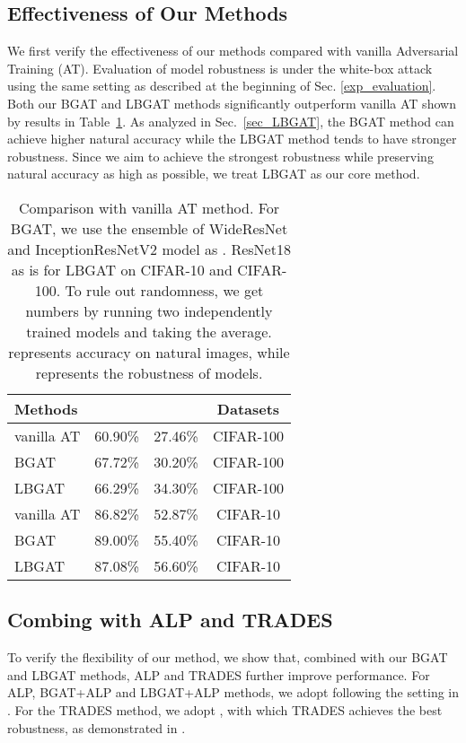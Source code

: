 \documentclass[final]{cvpr}
\begin{document}
\subsection{Effectiveness of Our Methods}
\label{exp_effectiveness}
We first verify the effectiveness of our methods compared with vanilla Adversarial Training (AT). Evaluation of model robustness is under the white-box attack using the same setting as described at the beginning of Sec. \ref{exp_evaluation}. Both our BGAT and LBGAT methods significantly outperform vanilla AT shown by results in Table~\ref{tab:effectiveness}. As analyzed in Sec.~\ref{sec_LBGAT}, the BGAT method can achieve higher natural accuracy while the LBGAT method tends to have stronger robustness. Since we aim to achieve the strongest robustness while preserving natural accuracy as high as possible, we treat LBGAT as our core method.   

\begin{table}[t!]
	\footnotesize
	\centering
	\caption{Comparison with vanilla AT method. For BGAT, we use the ensemble of WideResNet and InceptionResNetV2 model as . ResNet18 as  is for LBGAT on CIFAR-10 and CIFAR-100. To rule out randomness, we get numbers by running two independently trained models and taking the average.  represents accuracy on natural images, while  represents the robustness of models.} 
	\begin{tabular}{l|c|c|c}
		\textbf{Methods} & & &\textbf{Datasets} \\
		\hline
		\hline
		vanilla AT &60.90\% &27.46\%  &CIFAR-100 \\
		BGAT        &67.72\% &30.20\% &CIFAR-100 \\
		LBGAT       &66.29\% &34.30\% &CIFAR-100 \\
		\hline
		vanilla AT &86.82\% &52.87\%  &CIFAR-10\\
		BGAT        &89.00\% &55.40\% &CIFAR-10 \\
		LBGAT       &87.08\% &56.60\% &CIFAR-10 \\
		\hline
	\end{tabular}
	\label{tab:effectiveness}
\end{table}

\subsection{Combing with ALP and TRADES}
\label{exp_flexibility}
To verify the flexibility of our method, we show that, combined with our BGAT and LBGAT methods, ALP and TRADES further improve performance. For ALP, BGAT+ALP and LBGAT+ALP methods, we adopt  following the setting in \cite{DBLP:journals/corr/abs-1803-06373}. For the TRADES method, we adopt , with which TRADES achieves the best robustness, as demonstrated in \cite{zhang2019theoretically}.
\end{document}
